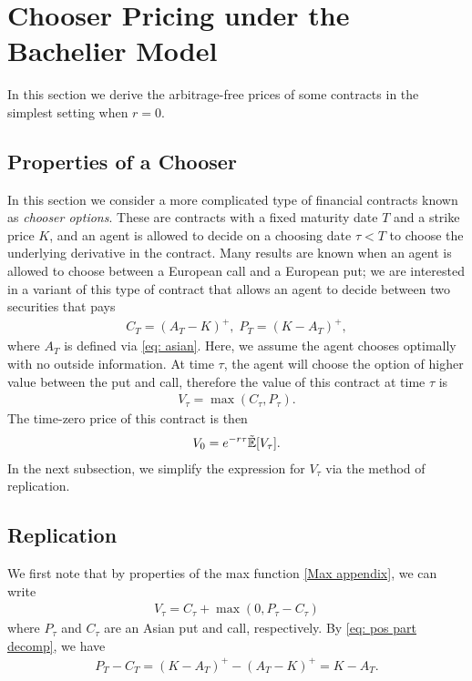 \documentclass[reqno]{amsart}
\begin{document}
\section{Chooser Pricing under the Bachelier Model}
In this section we derive the arbitrage-free prices of some contracts in the simplest setting when $r = 0$.  
\subsection{Properties of a Chooser}
In this section we consider a more complicated type of financial contracts known as \emph{chooser options}. 
These are contracts with a fixed maturity date $T$ and a strike price $K$, and an agent is allowed to decide on a choosing date $\tau < T$ to choose the underlying derivative in the contract.
Many results are known when an agent is allowed to choose between a European call and a European put; we are interested in a variant of this type of contract that allows an agent to decide between two securities that pays 
\begin{align}
     C_T = (A_T - K)^+, \; P_T = (K - A_T)^+,
\end{align}
where $A_T$ is defined via \eqref{eq: asian}.
Here, we assume the agent chooses optimally with no outside information. At time $\tau$, the agent will choose the option of higher value between the put and call, therefore the value of this contract at time $\tau$ is 
\begin{align}\label{eq: V_tau}
     V_\tau = \max(C_\tau, P_\tau).
\end{align}
The time-zero price of this contract is then 
\begin{align}
      V_0 = e^{-r\tau}\tilde{\mathbb{E}}[V_\tau].
\end{align}
In the next subsection, we simplify the expression for $V_\tau$ via the method of replication. 
\subsection{Replication}
We first note that by properties of the max function \eqref{Max appendix}, we can write 
\begin{align}\label{eq: chooser formula PC}
     V_\tau = C_\tau + \max(0, P_\tau - C_\tau)
\end{align}
where $P_\tau$ and $C_\tau$ are an Asian put and call, respectively.
By \eqref{eq: pos part decomp}, we have
\begin{align}\label{eq: P - C}
     P_T - C_T = (K-A_T)^+ - (A_T - K)^+ = K - A_T. 
\end{align}
\end{document}
